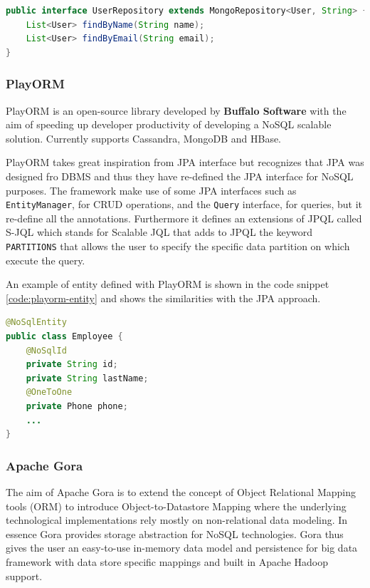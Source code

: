 \begin{lstlisting}[language=Java, caption=Spring Data repositories, label=code:spring-dao]
public interface UserRepository extends MongoRepository<User, String> {
    List<User> findByName(String name);
    List<User> findByEmail(String email);
}
\end{lstlisting}

\subsubsection{PlayORM}
PlayORM \cite{online:playorm} is an open-source library developed by \textbf{Buffalo Software} with the aim of speeding up developer productivity of developing a NoSQL scalable solution. Currently supports Cassandra, MongoDB and HBase. 

\noindent PlayORM takes great inspiration from JPA interface but recognizes that JPA was designed fro DBMS and thus they have re-defined the JPA interface  for NoSQL purposes.
The framework make use of some JPA interfaces such as \texttt{EntityManager}, for CRUD operations, and the \texttt{Query} interface, for queries, but it re-define all the annotations.
Furthermore it defines an extensions of JPQL called S-JQL which stands for Scalable JQL that adds to JPQL the keyword \texttt{PARTITIONS} that allows the user to specify the specific data partition on which execute the query.

\noindent An example of entity defined with PlayORM is shown in the code snippet \ref{code:playorm-entity} and shows the similarities with the JPA approach.

\begin{lstlisting}[language=Java, caption=PlayORM object mapping, label=code:playorm-entity]
@NoSqlEntity
public class Employee {
    @NoSqlId
    private String id;
    private String lastName;
    @OneToOne
    private Phone phone;
    ...
}
\end{lstlisting}

\subsubsection{Apache Gora}
The aim of Apache Gora \cite{online:apache-gora} is to extend the concept of Object Relational Mapping tools (ORM) to introduce Object-to-Datastore Mapping where the underlying technological implementations rely mostly on non-relational data modeling. In essence Gora provides storage abstraction for NoSQL technologies. 
Gora thus gives the user an easy-to-use in-memory data model and persistence for big data framework with data store specific mappings and built in Apache Hadoop support.

